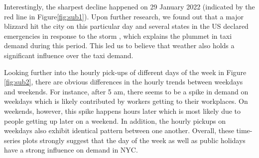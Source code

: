 \documentclass[11pt]{article}
\begin{document}
Interestingly, the sharpest decline happened on 29 January 2022 (indicated by the red line in Figure\ref{fig:sub1}). Upon further research, we found out that a major blizzard hit the city on this particular day and several states in the US declared emergencies in response to the storm \cite{blizzard}, which explains the plummet in taxi demand during this period. This led us to believe that weather also holds a significant influence over the taxi demand. 

Looking further into the hourly pick-ups of different days of the week in Figure \ref{fig:sub2}, there are obvious differences in the hourly trends between weekdays and weekends. For instance, after 5 am, there seems to be a spike in demand on weekdays which is likely contributed by workers getting to their workplaces. On weekends, however, this spike happens hours later which is most likely due to people getting up later on a weekend. In addition, the hourly pickups on weekdays also exhibit identical pattern between one another. Overall, these time-series plots strongly suggest that the day of the week as well as public holidays have a strong influence on demand in NYC.
\end{document}
